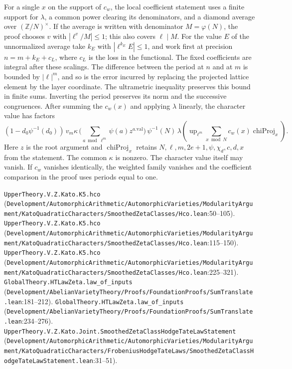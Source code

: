 For a single $x$ on the support of $c_w$, the local coefficient statement uses a finite support for $\lambda$, a common power clearing its denominators, and a diamond average over $(\mathbb Z/N)^\times$. If the average is written with denominator $M=\varphi(N)$, the proof chooses $v$ with $|\ell^v/M|\le1$; this also covers $\ell\mid M$. For the value $E$ of the unnormalized average take $k_E$ with $|\ell^{k_E}E|\le1$, and work first at precision $n=m+k_E+c_L$, where $c_L$ is the loss in the functional. The fixed coefficients are integral after these scalings. The difference between the period at $n$ and at $m$ is bounded by $|\ell|^m$, and so is the error incurred by replacing the projected lattice element by the layer coordinate. The ultrametric inequality preserves this bound in finite sums. Inverting the period preserves its norm and the successive congruences. After summing the $c_w(x)$ and applying $\lambda$ linearly, the character value has factors
\[
(1-d_0\psi^{-1}(d_0))\,v_m\kappa\,
  \Big(\sum_{a\bmod\ell^m}\psi(a)z^{a.\mathrm{val}}\Big)\,
  \psi^{-1}(N)\,\lambda\!\left(\operatorname{up}_{\ell^m}
     \sum_{x\bmod N}c_w(x)\operatorname{chiProj}_x\right).
\]
Here $z$ is the root argument and $\operatorname{chiProj}_x$ retains $N,\ell,m,2e+1,\psi,\chi_d,c,d,x$ from the statement. The common $\kappa$ is nonzero. The character value itself may vanish. If $c_w$ vanishes identically, the weighted family vanishes and the coefficient comparison in the proof uses periods equal to one.
\par{\footnotesize \nolinkurl{UpperTheory.V.Z.Kato.K5.hco} (\nolinkurl{Development/AutomorphicArithmetic/AutomorphicVarieties/ModularityArgument/KatoQuadraticCharacters/SmoothedZetaClasses/Hco.lean}\allowbreak:50--105). \nolinkurl{UpperTheory.V.Z.Kato.K5.hco} (\nolinkurl{Development/AutomorphicArithmetic/AutomorphicVarieties/ModularityArgument/KatoQuadraticCharacters/SmoothedZetaClasses/Hco.lean}\allowbreak:115--150). \nolinkurl{UpperTheory.V.Z.Kato.K5.hco} (\nolinkurl{Development/AutomorphicArithmetic/AutomorphicVarieties/ModularityArgument/KatoQuadraticCharacters/SmoothedZetaClasses/Hco.lean}\allowbreak:225--321). \nolinkurl{GlobalTheory.HTLawZeta.law_of_inputs} (\nolinkurl{Development/AbelianVarietyTheory/Proofs/FoundationProofs/SumTranslate.lean}\allowbreak:181--212). \nolinkurl{GlobalTheory.HTLawZeta.law_of_inputs} (\nolinkurl{Development/AbelianVarietyTheory/Proofs/FoundationProofs/SumTranslate.lean}\allowbreak:234--276). \nolinkurl{UpperTheory.V.Z.Kato.Joint.SmoothedZetaClassHodgeTateLawStatement} (\nolinkurl{Development/AutomorphicArithmetic/AutomorphicVarieties/ModularityArgument/KatoQuadraticCharacters/FrobeniusHodgeTateLaws/SmoothedZetaClassHodgeTateLawStatement.lean}\allowbreak:31--51).\par}

